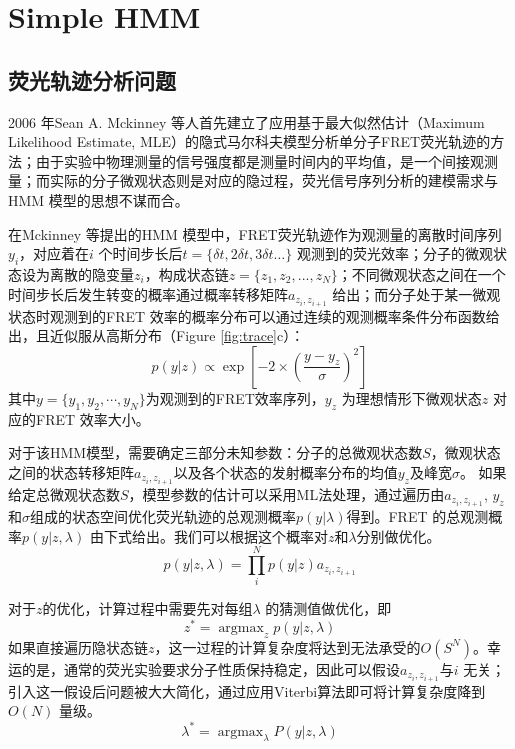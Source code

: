 \documentclass[11pt, a4paper]{article}
\DeclareMathOperator*{\argmax}{argmax}
\begin{document}
\section{Simple HMM}\label{chapter:HMM}
\subsection{荧光轨迹分析问题}

2006 年Sean A. Mckinney 等人首先建立了应用基于最大似然估计（Maximum Likelihood Estimate, MLE）的隐式马尔科夫模型分析单分子FRET荧光轨迹的方法\cite{HMM}；由于实验中物理测量的信号强度都是测量时间内的平均值，是一个间接观测量；而实际的分子微观状态则是对应的隐过程，荧光信号序列分析的建模需求与HMM 模型的思想不谋而合。

在Mckinney 等提出的HMM 模型中，FRET荧光轨迹作为观测量的离散时间序列$y_i$，对应着在$i$ 个时间步长后$t=\{\delta t,2\delta t,3\delta t…\}$ 观测到的荧光效率；分子的微观状态设为离散的隐变量$z_i$，构成状态链$z=\{z_1,z_2,...,z_N\}$；不同微观状态之间在一个时间步长后发生转变的概率通过概率转移矩阵$a_{z_{i}, z_{i+1}}$ 给出；而分子处于某一微观状态时观测到的FRET 效率的概率分布可以通过连续的观测概率条件分布函数给出，且近似服从高斯分布（Figure \ref{fig:trace}c）：
\begin{equation}
p(y|z) \propto \exp\left[-2\times\left(\frac{y- y_z}{\sigma}\right)^2\right]
\end{equation}
其中$y=\{y_1, y_2,\cdots, y_N\}$为观测到的FRET效率序列，$y_{z}$ 为理想情形下微观状态$z$ 对应的FRET 效率大小。

对于该HMM模型，需要确定三部分未知参数：分子的总微观状态数$S$，微观状态之间的状态转移矩阵$a_{z_i, z_{i+1}}$以及各个状态的发射概率分布的均值$y_{z}$及峰宽$\sigma$。 如果给定总微观状态数$S$，模型参数的估计可以采用ML法处理，通过遍历由$a_{z_{i}, z_{i+1}}$, $y_{z} $和$\sigma$组成的状态空间优化荧光轨迹的总观测概率$p(y| \lambda)$得到。FRET 的总观测概率$p(y|z,\lambda)$ 由下式给出。我们可以根据这个概率对$z$和$\lambda$分别做优化。
\begin{equation}
p(y|z,\lambda)= \prod_i^N p(y|z) a_{z_{i}, z_{i+1}}
\end{equation}


对于$z$的优化，计算过程中需要先对每组$\lambda$ 的猜测值做优化，即
\begin{equation}\label{eqn:z_opt}
  z^*=\argmax_z p(y|z, \lambda)
\end{equation}
如果直接遍历隐状态链$z$，这一过程的计算复杂度将达到无法承受的$O(S^N)$。幸运的是，通常的荧光实验要求分子性质保持稳定，因此可以假设$a_{z_{i}, z_{i+1}}$与$i$ 无关；引入这一假设后问题被大大简化，通过应用Viterbi算法即可将计算复杂度降到$O(N)$ 量级。
\begin{equation}
\lambda^*=\argmax_{\lambda} P(y|z,\lambda)
\end{equation}
\end{document}
